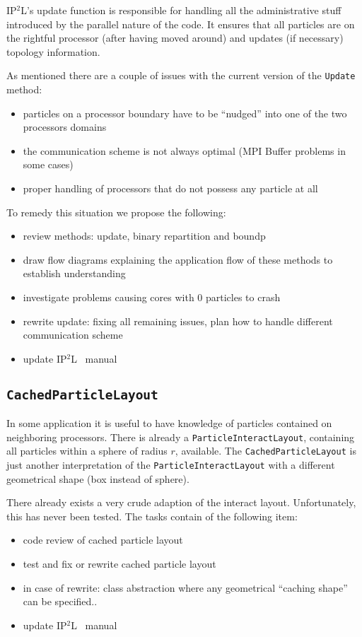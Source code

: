 \documentclass[10pt,a4paper]{scrartcl}
\newcommand{\ippl}{\textsc{IP$^2$L}}
\begin{document}
\ippl's update function is responsible for handling all the administrative stuff
introduced by the parallel nature of the code. It ensures that all particles are
on the rightful processor (after having moved around) and updates (if necessary)
topology information.

As mentioned there are a couple of issues with the current version of the
\texttt{Update} method:
%
\begin{itemize}
    \item particles on a processor boundary have to be ``nudged'' into one of
    the two processors domains
    \item the communication scheme is not always optimal (MPI Buffer problems in
    some cases)
    \item proper handling of processors that do not possess any particle at all
\end{itemize}
%
To remedy this situation we propose the following:
%
\begin{itemize}
    \item review methods: update, binary repartition and boundp
    \item draw flow diagrams explaining the application flow of these methods to
    establish understanding
    \item investigate problems causing cores with 0 particles to crash
    \item rewrite update: fixing all remaining issues, plan how to
    handle different communication scheme
    \item update \ippl~ manual
\end{itemize}


\subsection{\texttt{CachedParticleLayout}}

In some application it is useful to have knowledge of particles contained on
neighboring processors. There is already a \texttt{ParticleInteractLayout},
containing all particles within a sphere of radius $r$, available. The
\texttt{CachedParticleLayout} is just another interpretation of the
\texttt{ParticleInteractLayout} with a different geometrical shape (box instead
of sphere).

There already exists a very crude adaption of the interact layout.
Unfortunately, this has never been tested. The tasks contain of the following
item:
%
\begin{itemize}
    \item code review of cached particle layout
    \item test and fix or rewrite cached particle layout
    \item in case of rewrite: class abstraction where any geometrical ``caching
    shape'' can be specified..
    \item update \ippl~ manual
\end{itemize}
\end{document}
